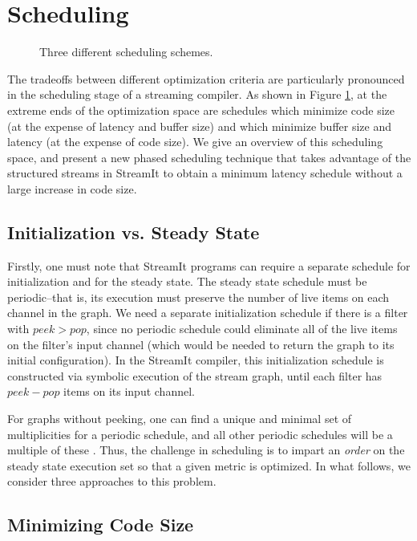 \section{Scheduling}

\begin{figure}
\centering
{}
\caption{Three different scheduling schemes.}
\label{fig:sched}
\end{figure}

The tradeoffs between different optimization criteria are particularly
pronounced in the scheduling stage of a streaming compiler.  As shown
in Figure \ref{fig:sched}, at the extreme ends of the optimization
space are schedules which minimize code size (at the expense of
latency and buffer size) and which minimize buffer size and latency
(at the expense of code size).  We give an overview of this scheduling
space, and present a new phased scheduling technique that takes
advantage of the structured streams in StreamIt to obtain a minimum
latency schedule without a large increase in code size.

\subsection{Initialization vs. Steady State}

Firstly, one must note that StreamIt programs can require a separate
schedule for initialization and for the steady state.  The steady
state schedule must be periodic--that is, its execution must preserve
the number of live items on each channel in the graph.  We need a
separate initialization schedule if there is a filter with $peek >
pop$, since no periodic schedule could eliminate all of the live items
on the filter's input channel (which would be needed to return the
graph to its initial configuration).  In the StreamIt compiler, this
initialization schedule is constructed via symbolic execution of the
stream graph, until each filter has $peek-pop$ items on its input
channel.

For graphs without peeking, one can find a unique and minimal set of
multiplicities for a periodic schedule, and all other periodic
schedules will be a multiple of these \cite{ptolemy}.  Thus, the
challenge in scheduling is to impart an {\it order} on the steady
state execution set so that a given metric is optimized.  In what
follows, we consider three approaches to this problem.

\subsection{Minimizing Code Size}

